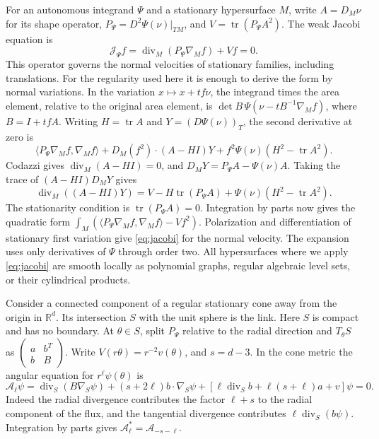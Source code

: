 \documentclass[11pt]{amsart}
\begin{document}
For an autonomous integrand \(\Psi\) and a stationary hypersurface \(M\),
write \(A=D_M\nu\) for its shape operator, \(P_\Psi=D^2\Psi(\nu)|_{TM}\),
and \(V=\operatorname{tr}(P_\Psi A^2)\). The weak Jacobi equation is
\begin{equation}\label{eq:jacobi}
 \mathcal J_\Psi f=\operatorname{div}_M(P_\Psi\nabla_M f)+V f=0.
\end{equation}
This operator governs the normal velocities of stationary families,
including translations. For the regularity used here it is enough to
derive the form by normal variations. In the variation \(x\mapsto x+t f\nu\),
the integrand times the area element, relative to the original area
element, is
\(\det B\,\Psi(\nu-t B^{-1}\nabla_M f)\), where \(B=I+t f A\).
Writing \(H=\operatorname{tr} A\) and \(Y=(D\Psi(\nu))_T\), the second
derivative at zero is
\[
 \langle P_\Psi\nabla_M f,\nabla_M f\rangle+
 D_M(f^2)\cdot (A-HI)Y+f^2\Psi(\nu)(H^2-\operatorname{tr} A^2).
\]
Codazzi gives \(\operatorname{div}_M(A-HI)=0\), and
\(D_M Y=P_\Psi A-\Psi(\nu)A\). Taking the trace of
\((A-HI)D_M Y\) gives
\[
 \operatorname{div}_M((A-HI)Y)
 =V-H\operatorname{tr}(P_\Psi A)+\Psi(\nu)(H^2-\operatorname{tr}A^2).
\]
The stationarity condition is \(\operatorname{tr}(P_\Psi A)=0\).
Integration by parts now gives the quadratic form
\(\int_M(\langle P_\Psi\nabla_M f,\nabla_M f\rangle-V f^2)\).
Polarization and differentiation of stationary first variation give
\eqref{eq:jacobi} for the normal velocity. The expansion uses only derivatives of
\(\Psi\) through order two. All hypersurfaces where we apply \eqref{eq:jacobi}
are smooth locally as polynomial graphs, regular algebraic level
sets, or their cylindrical products.

Consider a connected component of a regular stationary cone away
from the origin in \(\mathbb R^d\). Its intersection \(S\) with the
unit sphere is the link. Here \(S\) is compact and has no boundary.
At \(\theta\in S\), split \(P_\Psi\) relative to the radial direction
and \(T_\theta S\) as
\(\left(\begin{smallmatrix}a&b^{\!T}\\b&B\end{smallmatrix}\right)\).
Write \(V(r\theta)=r^{-2}v(\theta)\), and \(s=d-3\). In the cone
metric the angular equation for \(r^\ell\psi(\theta)\) is
\begin{equation}\label{eq:angular}
 \mathcal A_\ell\psi=
 \operatorname{div}_S(B\nabla_S\psi)+(s+2\ell)b\cdot\nabla_S\psi+
  [\ell\operatorname{div}_S b+\ell(s+\ell)a+v]\psi=0.
\end{equation}
Indeed the radial divergence contributes the factor \(\ell+s\) to
the radial component of the flux, and the tangential divergence
contributes \(\ell\operatorname{div}_S(b\psi)\). Integration by parts
gives \(\mathcal A_\ell^*=\mathcal A_{-s-\ell}\).
\end{document}
